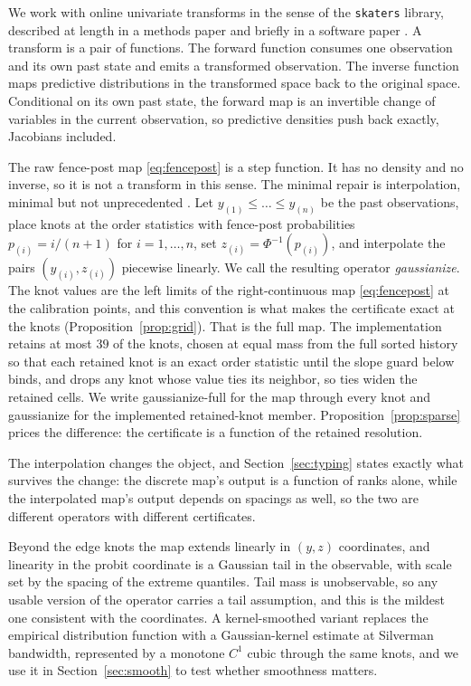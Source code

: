\documentclass[11pt]{article}
\theoremstyle{remark}
\begin{document}
We work with online univariate transforms in the sense of the \texttt{skaters} library,
described at length in a methods paper \citep{cotton_skaters} and briefly in a software
paper \citep{cotton_skaters_joss}. A transform is a pair of functions. The forward function consumes
one observation and its own past state and emits a transformed observation. The inverse
function maps predictive distributions in the transformed space back to the original space.
Conditional on its own past state, the forward map is an invertible change of variables in
the current observation, so predictive densities push back exactly, Jacobians included.

The raw fence-post map \eqref{eq:fencepost} is a step function. It has no density and no
inverse, so it is not a transform in this sense. The minimal repair is interpolation,
minimal but not unprecedented \citep{harar2022redistributor}. Let
$y_{(1)} \le \dots \le y_{(n)}$ be the past observations, place knots at the order
statistics with fence-post probabilities $p_{(i)} = i/(n+1)$ for
$i = 1, \dots, n$, set
$z_{(i)} = \Phi^{-1}(p_{(i)})$, and interpolate the pairs $(y_{(i)}, z_{(i)})$ piecewise
linearly. We call the resulting operator \emph{gaussianize}. The knot values are the
left limits of the right-continuous map \eqref{eq:fencepost} at the calibration points,
and this convention is what makes the certificate exact at the knots
(Proposition~\ref{prop:grid}). That is the full map. The implementation retains at
most $39$ of the knots, chosen at equal mass from the full sorted history so that
each retained knot is an exact order statistic until the slope guard below binds, and
drops any knot whose value ties its neighbor, so ties widen the retained cells. We write gaussianize-full for the map
through every knot and gaussianize for the implemented retained-knot member.
Proposition~\ref{prop:sparse} prices the difference: the certificate is a function of
the retained resolution.

The interpolation changes
the object, and Section~\ref{sec:typing} states exactly what survives the change: the
discrete map's output is a function of ranks alone, while the interpolated map's output
depends on spacings as well, so the two are different operators with different
certificates.

Beyond the edge knots the map
extends linearly in $(y, z)$ coordinates, and linearity in the probit coordinate is a
Gaussian tail in the observable, with scale set by the spacing of the extreme quantiles.
Tail mass is unobservable, so any usable version of the operator carries a tail assumption,
and this is the mildest one consistent with the coordinates. A kernel-smoothed variant
replaces the empirical distribution function with a Gaussian-kernel estimate at Silverman
bandwidth, represented by a monotone $C^1$ cubic through the same knots, and we use it in
Section~\ref{sec:smooth} to test whether smoothness matters.
\end{document}
